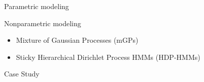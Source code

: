 \documentclass[final, 8pt]{beamer}
\newlength{\onecolwid}
\begin{document}
\begin{frame}
\begin{columns}
\begin{column}{\onecolwid}
\begin{block}{Parametric modeling}
\end{block}

\begin{block}{Nonparametric modeling}
\begin{itemize}
\item Mixture of Gaussian Processes (mGPs)
\item Sticky Hierarchical Dirichlet Process HMMs (HDP-HMMs)
\end{itemize}
\end{block}

\begin{block}{Case Study}
\end{block}

\end{column}

\begin{column}{\onecolwid}
 
 
\end{column}

\end{columns}

\end{frame}
\end{document}
